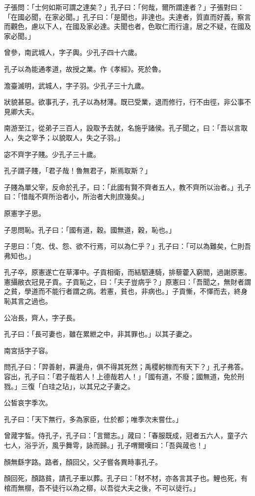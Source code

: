 \begin{pinyinscope}
子張問：「士何如斯可謂之達矣？」孔子曰：「何哉，爾所謂達者？」子張對曰：「在國必聞，在家必聞。」孔子曰：「是聞也，非達也。夫達者，質直而好義，察言而觀色，慮以下人，在國及家必達。夫聞也者，色取仁而行違，居之不疑，在國及家必聞。」

曾參，南武城人，字子輿。少孔子四十六歲。

孔子以為能通孝道，故授之業。作《孝經》。死於魯。

澹臺滅明，武城人，字子羽。少孔子三十九歲。

狀貌甚惡。欲事孔子，孔子以為材薄。既已受業，退而修行，行不由徑，非公事不見卿大夫。

南游至江，從弟子三百人，設取予去就，名施乎諸侯。孔子聞之，曰：「吾以言取人，失之宰予；以貌取人，失之子羽。」

宓不齊字子賤。少孔子三十歲。

孔子謂子賤，「君子哉！魯無君子，斯焉取斯？」

子賤為單父宰，反命於孔子，曰：「此國有賢不齊者五人，教不齊所以治者。」孔子曰：「惜哉不齊所治者小，所治者大則庶幾矣。」

原憲字子思。

子思問恥。孔子曰：「國有道，穀。國無道，穀，恥也。」

子思曰：「克、伐、怨、欲不行焉，可以為仁乎？」孔子曰：「可以為難矣，仁則吾弗知也。」

孔子卒，原憲遂亡在草澤中。子貢相衛，而結駟連騎，排藜藿入窮閻，過謝原憲。憲攝敝衣冠見子貢。子貢恥之，曰：「夫子豈病乎？」原憲曰：「吾聞之，無財者謂之貧，學道而不能行者謂之病。若憲，貧也，非病也。」子貢慚，不懌而去，終身恥其言之過也。

公冶長，齊人，字子長。

孔子曰：「長可妻也，雖在累紲之中，非其罪也。」以其子妻之。

南宮括字子容。

問孔子曰：「羿善射，奡盪舟，俱不得其死然；禹稷躬稼而有天下？」孔子弗答。容出，孔子曰：「君子哉若人！上德哉若人！」「國有道，不廢；國無道，免於刑戮。」三復「白珪之玷」，以其兄之子妻之。

公皙哀字季次。

孔子曰：「天下無行，多為家臣，仕於都；唯季次未嘗仕。」

曾蒧字皙。侍孔子，孔子曰：「言爾志。」蒧曰：「春服既成，冠者五六人，童子六七人，浴乎沂，風乎舞雩，詠而歸。」孔子喟爾嘆曰：「吾與蒧也！」

顏無繇字路。路者，顏回父，父子嘗各異時事孔子。

顏回死，顏路貧，請孔子車以葬。孔子曰：「材不材，亦各言其子也。鯉也死，有棺而無槨，吾不徒行以為之槨，以吾從大夫之後，不可以徒行。」


\end{pinyinscope}

